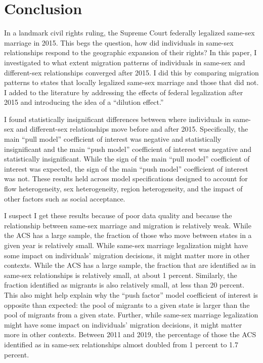 \documentclass[12pt,letterpaper]{article}
\begin{document}
\FloatBarrier %
\section{Conclusion}

In a landmark civil rights ruling, the Supreme Court federally legalized same-sex marriage in 2015. This begs the question, how did individuals in same-sex relationships respond to the geographic expansion of their rights? In this paper, I investigated to what extent migration patterns of individuals in same-sex and different-sex relationships converged after 2015. I did this by comparing migration patterns to states that locally legalized same-sex marriage and those that did not. I added to the literature by addressing the effects of federal legalization after 2015 and introducing the idea of a “dilution effect.”

I found statistically insignificant differences between where individuals in same-sex and different-sex relationships move before and after 2015. Specifically, the main “pull model” coefficient of interest was negative and statistically insignificant and the main “push model” coefficient of interest was negative and statistically insignificant. While the sign of the main “pull model” coefficient of interest was expected, the sign of the main “push model” coefficient of interest was not. These results held across model specifications designed to account for flow heterogeneity, sex heterogeneity, region heterogeneity, and the impact of other factors such as social acceptance. 

I suspect I get these results because of poor data quality and because the relationship between same-sex marriage and migration is relatively weak. While the ACS has a large sample, the fraction of those who move between states in a given year is relatively small. While same-sex marriage legalization might have some impact on individuals’ migration decisions, it might matter more in other contexts. While the ACS has a large sample, the fraction that are identified as in same-sex relationships is relatively small, at about 1 percent. Similarly, the fraction identified as migrants is also relatively small, at less than 20 percent. This also might help explain why the “push factor” model coefficient of interest is opposite than expected: the pool of migrants to a given state is larger than the pool of migrants from a given state. Further, while same-sex marriage legalization might have some impact on individuals’ migration decisions, it might matter more in other contexts. Between 2011 and 2019, the percentage of those the ACS identified as in same-sex relationships almost doubled from 1 percent to 1.7 percent.
\end{document}
